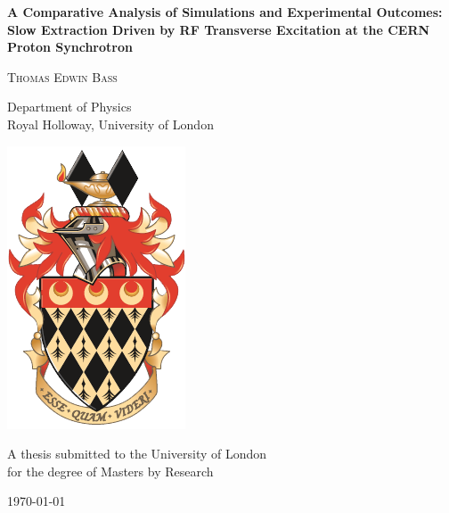 \begin{titlepage}

\center

\vspace*{0.1cm}

\begin{spacing}{2}

{ \LARGE \bfseries A Comparative Analysis of Simulations and Experimental Outcomes: Slow Extraction Driven by RF Transverse Excitation at the CERN Proton Synchrotron}\\[0.4cm] 

\vspace{0.7cm}

\textsc{\Large Thomas Edwin Bass}\\[0.5cm]

\end{spacing}
\begin{spacing}{1.5}
{\Large Department of Physics\\
Royal Holloway, University of London}\\[1.5cm]
\end{spacing}

\includegraphics[width=0.35\linewidth]{Royal_Holloway_coat_of_arms.png}\\[1cm] %
\begin{spacing}{1.5}
\begin{center}
    {\Large A thesis submitted to the University of London\\for the degree of Masters by Research}\\[1cm]
\end{center}
\vspace{1cm}
{\large \today}
\end{spacing}


\end{titlepage}

